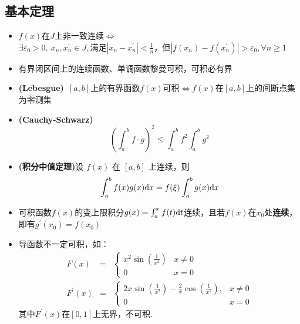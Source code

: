 \documentclass[./main.tex]{subfiles}
\begin{document}
\subsection{基本定理}
\begin{itemize}
  \item $f(x)$在$J$上非一致连续$\iff$\\$\exists\varepsilon_0>0,\ x_n,x_n^{\prime}\in J,$满足$|x_n-x_n^{\prime}|<\frac{1}{n}$，但$|f(x_n)-f(x_n^{\prime})|>\varepsilon_0,\forall n\ge 1$
  \item 有界闭区间上的连续函数、单调函数黎曼可积，可积必有界
  \item \textbf{(Lebesgue)}\ $[a,b]$上的有界函数$f(x)$可积$\iff f(x)$在$[a,b]$上的间断点集为零测集
  \item \textbf{(Cauchy-Schwarz)}$$ \left(\int_a^bf\cdot g\right)^2\le\int_a^bf^2\int_a^bg^2 $$
  \item \textbf{(积分中值定理)}设 $f(x)$ 在 $[a,b]$ 上连续，则$$\int_a^bf(x)g(x)\text{d}x=f(\xi)\int_a^bg(x)\text{d}x$$
  \item 可积函数$f(x)$的变上限积分$g(x)=\int_a^xf(t)\text{d}t$连续，且若$f(x)$在$x_0$处\textbf{连续}，即有$g^{\prime}(x_0)=f(x_0)$
  \item 导函数不一定可积，如：
  \begin{eqnarray*}
    F(x)&=&\begin{cases}
    x^2\sin(\frac{1}{x^2}) & x\neq 0 \\0&x=0 
    \end{cases}\\
    F^{\prime}(x)&=&\begin{cases}
    2x\sin(\frac{1}{x^2})-\frac{2}{x}\cos(\frac{1}{x^2}),& x\neq 0 \\0&x=0 
    \end{cases}
  \end{eqnarray*}
  其中$F^{\prime}(x)$在$[0,1]$上无界，不可积.
\end{itemize}
\end{document}
